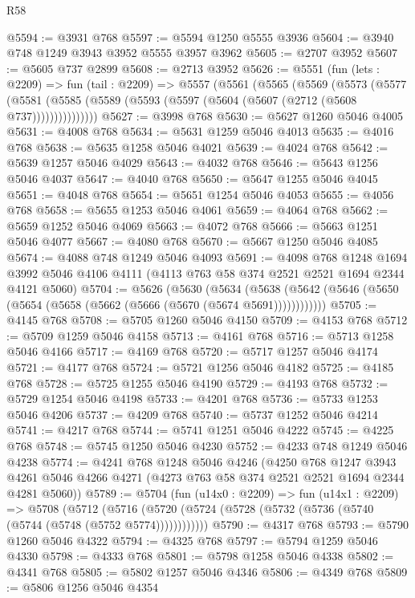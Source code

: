 \begin{lexlean}{R58}
\begin{coremodule}
@5594 := @3931 @768
@5597 := @5594 @1250 @5555 @3936
@5604 := @3940 @748 @1249 @3943 @3952 @5555 @3957 @3962
@5605 := @2707 @3952
@5607 := @5605 @737 @2899
@5608 := @2713 @3952
@5626 := @5551
    (fun (lets : @2209) =>
    fun (tail : @2209) =>
    @5557
      (@5561
        (@5565
          (@5569
            (@5573
              (@5577
                (@5581 (@5585 (@5589 (@5593 (@5597 (@5604 (@5607 (@2712 (@5608 @737)))))))))))))))
@5627 := @3998 @768
@5630 := @5627 @1260 @5046 @4005
@5631 := @4008 @768
@5634 := @5631 @1259 @5046 @4013
@5635 := @4016 @768
@5638 := @5635 @1258 @5046 @4021
@5639 := @4024 @768
@5642 := @5639 @1257 @5046 @4029
@5643 := @4032 @768
@5646 := @5643 @1256 @5046 @4037
@5647 := @4040 @768
@5650 := @5647 @1255 @5046 @4045
@5651 := @4048 @768
@5654 := @5651 @1254 @5046 @4053
@5655 := @4056 @768
@5658 := @5655 @1253 @5046 @4061
@5659 := @4064 @768
@5662 := @5659 @1252 @5046 @4069
@5663 := @4072 @768
@5666 := @5663 @1251 @5046 @4077
@5667 := @4080 @768
@5670 := @5667 @1250 @5046 @4085
@5674 := @4088 @748 @1249 @5046 @4093
@5691 := @4098
    @768
    @1248
    @1694
    @3992
    @5046
    @4106
    @4111
    (@4113 @763 @58 @374 @2521 @2521 @1694 @2344 @4121 @5060)
@5704 := @5626
    (@5630
      (@5634 (@5638 (@5642 (@5646 (@5650 (@5654 (@5658 (@5662 (@5666 (@5670 (@5674 @5691))))))))))))
@5705 := @4145 @768
@5708 := @5705 @1260 @5046 @4150
@5709 := @4153 @768
@5712 := @5709 @1259 @5046 @4158
@5713 := @4161 @768
@5716 := @5713 @1258 @5046 @4166
@5717 := @4169 @768
@5720 := @5717 @1257 @5046 @4174
@5721 := @4177 @768
@5724 := @5721 @1256 @5046 @4182
@5725 := @4185 @768
@5728 := @5725 @1255 @5046 @4190
@5729 := @4193 @768
@5732 := @5729 @1254 @5046 @4198
@5733 := @4201 @768
@5736 := @5733 @1253 @5046 @4206
@5737 := @4209 @768
@5740 := @5737 @1252 @5046 @4214
@5741 := @4217 @768
@5744 := @5741 @1251 @5046 @4222
@5745 := @4225 @768
@5748 := @5745 @1250 @5046 @4230
@5752 := @4233 @748 @1249 @5046 @4238
@5774 := @4241
    @768
    @1248
    @5046
    @4246
    (@4250
      @768
      @1247
      @3943
      @4261
      @5046
      @4266
      @4271
      (@4273 @763 @58 @374 @2521 @2521 @1694 @2344 @4281 @5060))
@5789 := @5704
    (fun (u14x0 : @2209) =>
    fun (u14x1 : @2209) =>
    @5708
      (@5712 (@5716 (@5720 (@5724 (@5728 (@5732 (@5736 (@5740 (@5744 (@5748 (@5752 @5774))))))))))))
@5790 := @4317 @768
@5793 := @5790 @1260 @5046 @4322
@5794 := @4325 @768
@5797 := @5794 @1259 @5046 @4330
@5798 := @4333 @768
@5801 := @5798 @1258 @5046 @4338
@5802 := @4341 @768
@5805 := @5802 @1257 @5046 @4346
@5806 := @4349 @768
@5809 := @5806 @1256 @5046 @4354

\end{coremodule}
\end{lexlean}
